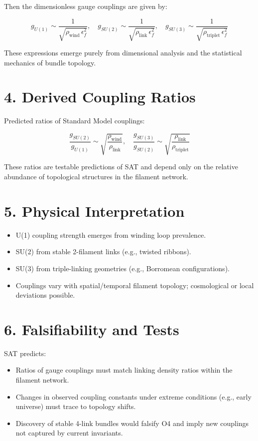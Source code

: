 \documentclass[12pt]{article}
\begin{document}
Then the dimensionless gauge couplings are given by:

\[
g_{U(1)} \sim \frac{1}{\sqrt{\rho_{\text{wind}} \, \epsilon_f^2}}, \quad
g_{SU(2)} \sim \frac{1}{\sqrt{\rho_{\text{link}} \, \epsilon_f^2}}, \quad
g_{SU(3)} \sim \frac{1}{\sqrt{\rho_{\text{triplet}} \, \epsilon_f^2}}
\]

These expressions emerge purely from dimensional analysis and the statistical mechanics of bundle topology.

\section*{4. Derived Coupling Ratios}

Predicted ratios of Standard Model couplings:

\[
\frac{g_{SU(2)}}{g_{U(1)}} \sim \sqrt{\frac{\rho_{\text{wind}}}{\rho_{\text{link}}}}, \quad
\frac{g_{SU(3)}}{g_{SU(2)}} \sim \sqrt{\frac{\rho_{\text{link}}}{\rho_{\text{triplet}}}}
\]

These ratios are testable predictions of SAT and depend only on the relative abundance of topological structures in the filament network.

\section*{5. Physical Interpretation}

\begin{itemize}
    \item U(1) coupling strength emerges from winding loop prevalence.
    \item SU(2) from stable 2-filament links (e.g., twisted ribbons).
    \item SU(3) from triple-linking geometries (e.g., Borromean configurations).
    \item Couplings vary with spatial/temporal filament topology; cosmological or local deviations possible.
\end{itemize}

\section*{6. Falsifiability and Tests}

SAT predicts:
\begin{itemize}
    \item Ratios of gauge couplings must match linking density ratios within the filament network.
    \item Changes in observed coupling constants under extreme conditions (e.g., early universe) must trace to topology shifts.
    \item Discovery of stable 4-link bundles would falsify O4 and imply new couplings not captured by current invariants.
\end{itemize}
\end{document}
